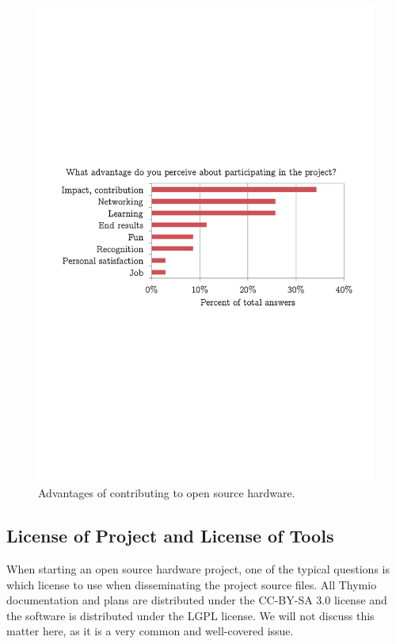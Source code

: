 \documentclass[letterpaper, 10 pt, conference]{ieeeconf}  %
\begin{document}
\begin{figure}
\centering
\includegraphics[width=\columnwidth]{figures/advantages}
\caption{Advantages of contributing to open source hardware.}
\label{fig:getout}
\end{figure}

\subsection{License of Project and License of Tools}

When starting an open source hardware project, one of the typical questions is which license to use when disseminating the project source files. 
All Thymio documentation and plans are distributed under the CC-BY-SA 3.0 license and the software is distributed under the LGPL license.
We will not discuss this matter here, as it is a very common and well-covered issue. 
\end{document}
